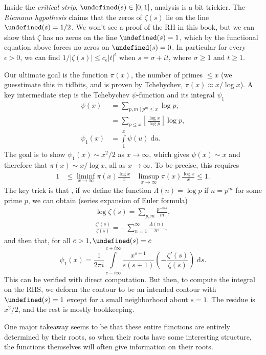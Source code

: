 \documentclass[11pt,
        usenames, %
        dvipsnames %
    ]{report}
\newcommand*{\abs}[1]{\left|#1\right|}
\newcommand*{\p}[1]{\left(#1\right)}
\let\Re\undefined
\DeclareMathOperator{\Re}{Re}
\begin{document}
\begin{itemize}
        Inside the \emph{critical strip}, $\Re(s) \in [0, 1]$, analysis is a bit
        trickier. The \emph{Riemann hypothesis} claims that the zeros of
        $\zeta(s)$ lie on the line $\Re(s) = 1/2$. We won't see a proof of the
        RH in this book, but we can show that $\zeta$ has no zeros on the line
        $\Re(s) = 1$, which by the functional equation above forces no zeros on
        $\Re(s) = 0$. In particular for every $\epsilon > 0$, we can find $1 /
        \abs{\zeta(s)} \leq c_\epsilon \abs{t}^\epsilon$ when $s = \sigma + it$,
        where $\sigma \geq 1$ and $t \geq 1$.

        Our ultimate goal is the function $\pi(x)$, the number of primes $\leq
        x$ (we guesstimate this in tidbits, and is proven by Tchebychev, $\pi(x)
        \approx x / \log x$). A key intermediate step is the Tchebychev
        $\psi$-function and its integral $\psi_1$
        \begin{align}
            \psi(x) &= \sum\limits_{p, m \mid p^m \leq x}\log p,\\
                &= \sum\limits_{p \leq x}\left\lfloor \frac{\log x}{\log p}
                    \right\rfloor \log p,\\
            \psi_1(x) &= \int\limits_1^x \psi(u)\;\mathrm{d}u.
        \end{align}
        The goal is to show $\psi_1(x) \sim x^2/2$ as $x \to \infty$, which
        gives $\psi(x) \sim x$ and therefore that $\pi(x) \sim x / \log x$, all
        as $x \to \infty$. To be precise, this requires
        \begin{align}
            1 &\leq \liminf_{x \to \infty}\pi(x) \frac{\log x}{x} &
            \limsup_{x \to \infty} \pi(x) \frac{\log x}{x} \leq 1.
        \end{align}
        The key trick is that , if we define the function $\Lambda(n) = \log p$
        if $n = p^m$ for some prime $p$, we can obtain (series expansion of
        Euler formula)
        \begin{align}
            \log \zeta(s) = \sum\limits_{p, m}\frac{p^{-ms}}{m},\\
            \frac{\zeta'(s)}{\zeta(s)} = -\sum\limits_{n = 1}^\infty
                \frac{\Lambda(n)}{n^s},
        \end{align}
        and then that, for all $c > 1, \Re(s) = c$
        \begin{equation}
            \psi_1(x) = \frac{1}{2\pi i}\int\limits_{c - i\infty}
                ^{c + i\infty} \frac{x^{s + 1}}{s(s + 1)}
                    \p{-\frac{\zeta'(s)}{\zeta(s)}}\;\mathrm{d}s.
        \end{equation}
        This can be verified with direct computation. But then, to compute the
        integral on the RHS, we deform the contour to be an intended contour
        with $\Re(s) = 1$ except for a small neighborhood about $s = 1$. The
        residue is $x^2/2$, and the rest is mostly bookkeeping.
\end{itemize}
One major takeaway seems to be that these entire functions are entirely
determined by their roots, so when their roots have some interesting structure,
the functions themselves will often give information on their roots.
\end{document}
